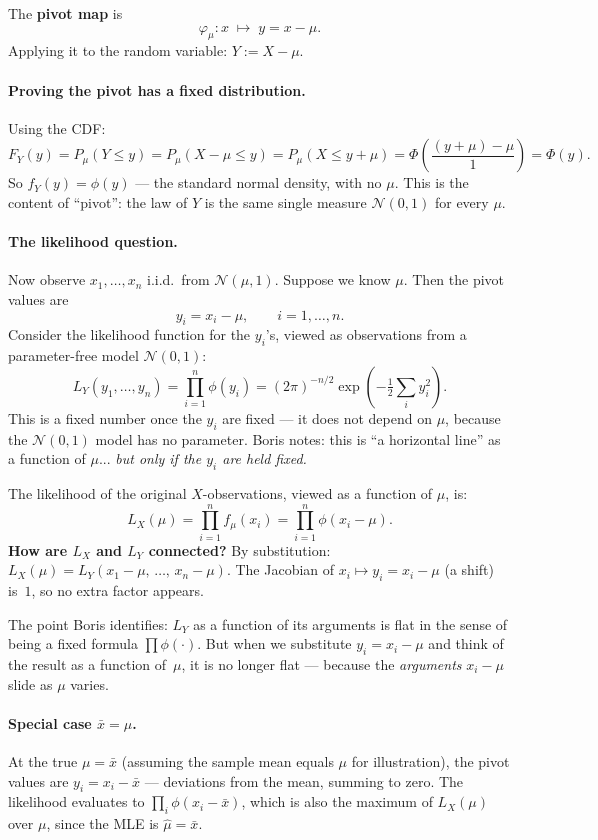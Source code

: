 \documentclass[a4paper,oneside,12pt]{extarticle}
\theoremstyle{plain}
\theoremstyle{definition}
\theoremstyle{remark}
\begin{document}
The \textbf{pivot map} is
\[
  \varphi_\mu : x \;\mapsto\; y = x - \mu.
\]
Applying it to the random variable: $Y := X - \mu$.

\paragraph{Proving the pivot has a fixed distribution.}
Using the CDF:
\[
  F_Y(y)
  = P_\mu(Y \leq y)
  = P_\mu(X - \mu \leq y)
  = P_\mu(X \leq y + \mu)
  = \Phi\!\left(\frac{(y+\mu) - \mu}{1}\right)
  = \Phi(y).
\]
So $f_Y(y) = \phi(y)$ — the standard normal density, with no $\mu$.
This is the content of ``pivot'': the law of $Y$ is the same
single measure $\mathcal{N}(0,1)$ for every $\mu$.

\paragraph{The likelihood question.}
Now observe $x_1,\ldots,x_n$ i.i.d.\ from $\mathcal{N}(\mu,1)$.
Suppose we know $\mu$.  Then the pivot values are
\[
  y_i = x_i - \mu, \qquad i = 1,\ldots,n.
\]
Consider the likelihood function for the $y_i$'s, viewed as
observations from a parameter-free model $\mathcal{N}(0,1)$:
\[
  L_Y(y_1,\ldots,y_n)
  = \prod_{i=1}^n \phi(y_i)
  = (2\pi)^{-n/2}\exp\!\left(-\tfrac{1}{2}\sum_i y_i^2\right).
\]
This is a fixed number once the $y_i$ are fixed --- it does
not depend on $\mu$, because the $\mathcal{N}(0,1)$ model has no
parameter.  Boris notes: this is ``a horizontal line'' as a function
of $\mu$... \emph{but only if the $y_i$ are held fixed.}

The likelihood of the original $X$-observations, viewed as a function
of $\mu$, is:
\[
  L_X(\mu)
  = \prod_{i=1}^n f_\mu(x_i)
  = \prod_{i=1}^n \phi(x_i - \mu).
\]
\textbf{How are $L_X$ and $L_Y$ connected?}  By substitution:
$L_X(\mu) = L_Y\!\left(x_1-\mu,\,\ldots,\,x_n-\mu\right)$.
The Jacobian of $x_i \mapsto y_i = x_i - \mu$ (a shift) is~$1$,
so no extra factor appears.

The point Boris identifies: $L_Y$ as a function of its arguments
is flat in the sense of being a fixed formula $\prod\phi(\cdot)$.
But when we substitute $y_i = x_i - \mu$ and think of the result
as a function of~$\mu$, it is no longer flat --- because the
\emph{arguments} $x_i - \mu$ slide as $\mu$ varies.

\paragraph{Special case $\bar x = \mu$.}
At the true $\mu = \bar x$ (assuming the sample mean equals $\mu$
for illustration), the pivot values are $y_i = x_i - \bar x$
--- deviations from the mean, summing to zero.
The likelihood evaluates to $\prod_i \phi(x_i - \bar x)$, which is
also the maximum of $L_X(\mu)$ over $\mu$, since the MLE is
$\hat\mu = \bar x$.
\end{document}
